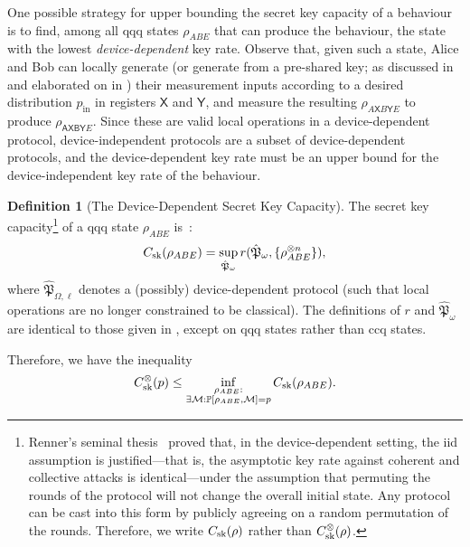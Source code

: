 \documentclass[10pt, a4paper]{article}
\numberwithin{equation}{section} %
\newcounter{stmt} %
\theoremstyle{definition}
\newtheorem{defn}[stmt]{Definition}
\theoremstyle{plain}
\newcommand{\?}{\mathrel{?}} %
\newcommand{\sM}{\mathcal{M}}
\newcommand{\crv}[1]{\mathsf{#1}}
\newcommand{\qproto}[2][_{\Omega,\ell}]{\hat{\mathfrak{#2}}#1}
\newcommand{\prin}[1][p]{#1_{\mathrm{in}}}
\newcommand{\behav}[2]{\mathbb{P}\left[#1, #2\right]}
\newcommand{\sk}{\rm sk}
\begin{document}
    One possible strategy for upper bounding the secret key capacity of a behaviour is to find, among all qqq states \(\rho_{ABE}\) that can produce the behaviour, the state with the lowest \emph{device-dependent} key rate. Observe that, given such a state, Alice and Bob can locally generate (or generate from a pre-shared key; as discussed in  and elaborated on in ) their measurement inputs according to a desired distribution \(\prin\) in registers \(\crv{X}\) and \(\crv{Y}\), and measure the resulting \(\rho_{A\crv{X}B\crv{Y}E}\) to produce \(\rho_{\crv{AXBY}E}\). Since these are valid local operations in a device-dependent protocol, device-independent protocols are a subset of device-dependent protocols, and the device-dependent key rate must be an upper bound for the device-independent key rate of the behaviour.

    \begin{defn}[The Device-Dependent Secret Key Capacity]\label{def:seckeycapstate}
    The secret key capacity\footnote{Renner's seminal thesis~\cite{RennerQKD} proved that, in the device-dependent setting, the iid assumption is justified---that is, the asymptotic key rate against coherent and collective attacks is identical---under the assumption that permuting the rounds of the protocol will not change the overall initial state. Any protocol can be cast into this form by publicly agreeing on a random permutation of the rounds. Therefore, we write \(C_{\sk}(\rho)\) rather than \(C^{\otimes}_{\sk}(\rho)\).} of a qqq state \(\rho_{ABE}\) is~\cite{CQKeyDistill}:
    \begin{equation}
      C_{\sk}(\rho_{A B E}) = \sup_{\hat{\mathfrak{P}}_{\omega}} r(\hat{\mathfrak{P}}_{\omega}, \{\rho_{ABE}^{\otimes n}\}),
    \end{equation}
    where \(\qproto{P}\) denotes a (possibly) device-dependent protocol (such that local operations are no longer constrained to be classical). The definitions of \(r\) and \(\hat{\mathfrak{P}}_{\omega}\) are identical to those given in , except on qqq states rather than ccq states.
  \end{defn}

    Therefore, we have the inequality
    \begin{equation}
      C^{\otimes}_{\sk}(p) \leq \inf_{ 
        \substack{\rho_{A B E} : \\ 
      \exists \sM : \behav{\rho_{A B E}}{ \sM} = p}
      } C_{\sk}(\rho_{A B E}).
    \end{equation}
\end{document}
